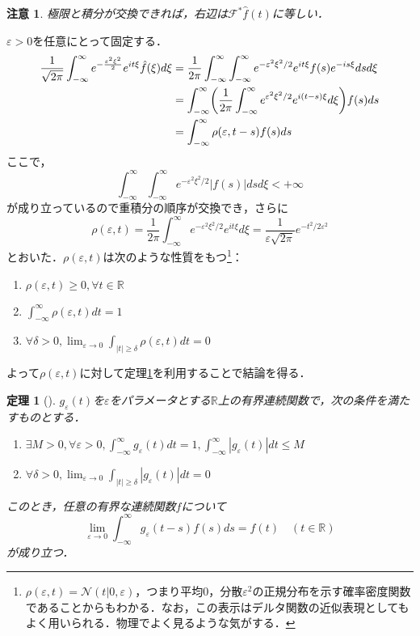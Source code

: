 \documentclass[dvipdfmx,a4j,10pt]{jsarticle}
\makeatletter
\theoremstyle{mystyle1}
\newtheorem{theorem}{定理}[section]
\theoremstyle{mystyle3}
\theoremstyle{mystyle4}
\newtheorem{note}{注意}[section]
\theoremstyle{mystyle6}
\theoremstyle{mystyle2}
\theoremstyle{mystyle5}
\renewenvironment{proof}[1][\proofname]{\par
  \pushQED{\qed}%
  \normalfont
  \topsep6\p@\@plus6\p@ \trivlist
  \item[\hskip\labelsep{\bfseries\sffamily #1}]\ignorespaces
}{%
  \popQED\endtrivlist\@endpefalse
}
\renewcommand\proofname{証明}
\newenvironment{thm}[1][]
{\begin{tcolorbox}[
    enhanced,
    boxrule=0pt,
    arc=0mm,
    frame hidden,
    borderline west={2pt}{-4pt}{red},
    breakable = true
    ]
    \begin{theorem}[#1]
}
{\end{theorem}\end{tcolorbox}}
\makeatother
\begin{document}

\begin{note}
	極限と積分が交換できれば，右辺は$\mathcal{F}^*\hat f(t)$に等しい．
\end{note}

\begin{proof}
	$\varepsilon>0$を任意にとって固定する．
	\begin{equation}\label{eq:3-1}
		\begin{split}
			\frac{1}{\sqrt{2\pi}}\int_{-\infty}^\infty e^{-\frac{\varepsilon^2\xi^2}{2}}e^{it\xi}\hat{f}(\xi)d\xi
			&=\frac{1}{2\pi}\int_{-\infty}^\infty\int_{-\infty}^\infty e^{-\varepsilon^2\xi^2/2}e^{it\xi}f(s)e^{-is\xi}dsd\xi \\
			&=\int_{-\infty}^\infty\mleft(\frac{1}{2\pi}\int_{-\infty}^\infty e^{\varepsilon^2\xi^2/2}e^{i(t-s)\xi}d\xi\mright)f(s)ds \\
			&=\int_{-\infty}^\infty \rho(\varepsilon,t-s)f(s)ds
		\end{split}
	\end{equation}
	ここで，
	\[
		\int_{-\infty}^\infty\int_{-\infty}^\infty e^{-\varepsilon^2\xi^2/2}|f(s)|dsd\xi<+\infty
	\]
	が成り立っているので重積分の順序が交換でき，さらに
	\[
		\rho(\varepsilon,t)=\frac{1}{2\pi}\int_{-\infty}^\infty e^{-\varepsilon^2\xi^2/2}e^{it\xi}d\xi=\frac{1}{\varepsilon\sqrt{2\pi}}e^{-t^2/2\varepsilon^2}
	\]
	とおいた．$\rho(\varepsilon,t)$は次のような性質をもつ\footnote{
		$\rho(\varepsilon,t)=\mathcal{N}(t|0,\varepsilon)$，つまり平均$0$，分散$\varepsilon^2$の正規分布を示す確率密度関数であることからもわかる．なお，この表示はデルタ関数の近似表現としてもよく用いられる．物理でよく見るような気がする．
	}：
	\begin{enumerate}
		\item $\rho(\varepsilon,t)\geq 0,\forall t\in\mathbb{R}$
		\item $\int_{-\infty}^\infty \rho(\varepsilon,t)dt=1$
		\item $\forall\delta>0,\lim_{\varepsilon\to 0}\int_{|t|\geq\delta}\rho(\varepsilon,t)dt=0$
	\end{enumerate}
	よって$\rho(\varepsilon,t)$に対して定理\ref{thm:3-4}を利用することで結論を得る．
\end{proof}

\begin{thm}\label{thm:3-4}
	$g_\varepsilon(t)$を$\varepsilon$をパラメータとする$\mathbb{R}$上の有界連続関数で，次の条件を満たすものとする．
	\begin{enumerate}
		\item $\exists M>0,\forall\varepsilon>0,\int_{-\infty}^\infty g_\varepsilon(t)dt=1,\int_{-\infty}^\infty|g_\varepsilon(t)|dt\leq M$
		\item $\forall \delta>0,\lim_{\varepsilon\to 0}\int_{|t|\geq \delta}|g_\varepsilon(t)|dt=0$
	\end{enumerate}
	このとき，任意の有界な連続関数$f$について
	\[
		\lim_{\varepsilon\to 0}\int_{-\infty}^\infty g_\varepsilon(t-s)f(s)ds=f(t)\quad(t\in\mathbb{R})
	\]
	が成り立つ．
\end{thm}
\end{document}
